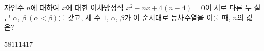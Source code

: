 자연수 $n$에 대하여 $x$에 대한 이차방정식 $x^2-nx+4(n-4)=0$이 서로 다른 두 실근 $\alpha$, $\beta\ (\alpha<\beta)$를 갖고, 세 수 $1$, $\alpha$, $\beta$가 이 순서대로 등차수열을 이룰 때, $n$의 값은?
\begin{choices32}{$5$}{$8$}{$11$}{$14$}{$17$}\end{choices32}
